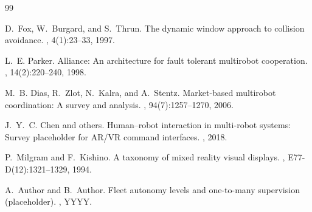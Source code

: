 \documentclass[11pt,a4paper]{article}
\begin{document}

\begin{thebibliography}{99}

D.~Fox, W.~Burgard, and S.~Thrun.
\newblock The dynamic window approach to collision avoidance.
, 4(1):23--33, 1997.

L.~E. Parker.
\newblock Alliance: An architecture for fault tolerant multirobot cooperation.
, 14(2):220--240, 1998.

M.~B. Dias, R.~Zlot, N.~Kalra, and A.~Stentz.
\newblock Market-based multirobot coordination: A survey and analysis.
, 94(7):1257--1270, 2006.

J.~Y.~C. Chen and others.
\newblock Human--robot interaction in multi-robot systems: Survey placeholder for AR/VR command interfaces.
, 2018.

P.~Milgram and F.~Kishino.
\newblock A taxonomy of mixed reality visual displays.
, E77-D(12):1321--1329, 1994.

A.~Author and B.~Author.
\newblock Fleet autonomy levels and one-to-many supervision (placeholder).
, YYYY.

\end{thebibliography}
\end{document}
